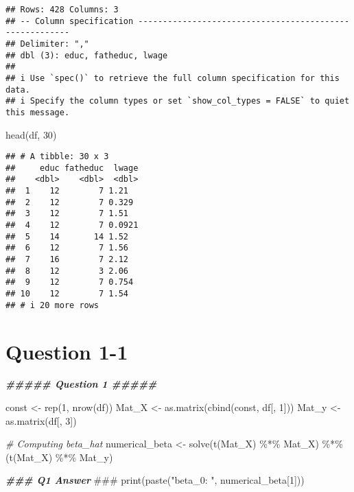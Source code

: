 \documentclass[
]{article}
\newenvironment{Shaded}{\begin{snugshade}}{\end{snugshade}}
\newcommand{\AlertTok}[1]{\textcolor[rgb]{0.94,0.16,0.16}{#1}}
\newcommand{\CommentTok}[1]{\textcolor[rgb]{0.56,0.35,0.01}{\textit{#1}}}
\newcommand{\DecValTok}[1]{\textcolor[rgb]{0.00,0.00,0.81}{#1}}
\newcommand{\DocumentationTok}[1]{\textcolor[rgb]{0.56,0.35,0.01}{\textbf{\textit{#1}}}}
\newcommand{\FunctionTok}[1]{\textcolor[rgb]{0.00,0.00,0.00}{#1}}
\newcommand{\NormalTok}[1]{#1}
\newcommand{\OtherTok}[1]{\textcolor[rgb]{0.56,0.35,0.01}{#1}}
\newcommand{\SpecialCharTok}[1]{\textcolor[rgb]{0.00,0.00,0.00}{#1}}
\newcommand{\StringTok}[1]{\textcolor[rgb]{0.31,0.60,0.02}{#1}}
\begin{document}
\begin{verbatim}
## Rows: 428 Columns: 3
## -- Column specification --------------------------------------------------------
## Delimiter: ","
## dbl (3): educ, fatheduc, lwage
## 
## i Use `spec()` to retrieve the full column specification for this data.
## i Specify the column types or set `show_col_types = FALSE` to quiet this message.
\end{verbatim}

\begin{Shaded}
\begin{Highlighting}[]
\FunctionTok{head}\NormalTok{(df, }\DecValTok{30}\NormalTok{)}
\end{Highlighting}
\end{Shaded}

\begin{verbatim}
## # A tibble: 30 x 3
##     educ fatheduc  lwage
##    <dbl>    <dbl>  <dbl>
##  1    12        7 1.21  
##  2    12        7 0.329 
##  3    12        7 1.51  
##  4    12        7 0.0921
##  5    14       14 1.52  
##  6    12        7 1.56  
##  7    16        7 2.12  
##  8    12        3 2.06  
##  9    12        7 0.754 
## 10    12        7 1.54  
## # i 20 more rows
\end{verbatim}

\hypertarget{question-1-1}{%
\section{Question 1-1}\label{question-1-1}}

\begin{Shaded}
\begin{Highlighting}[]
\DocumentationTok{\#\#\#\#\# Question 1 \#\#\#\#\#}

\NormalTok{const }\OtherTok{\textless{}{-}} \FunctionTok{rep}\NormalTok{(}\DecValTok{1}\NormalTok{, }\FunctionTok{nrow}\NormalTok{(df))}
\NormalTok{Mat\_X }\OtherTok{\textless{}{-}} \FunctionTok{as.matrix}\NormalTok{(}\FunctionTok{cbind}\NormalTok{(const, df[, }\DecValTok{1}\NormalTok{]))}
\NormalTok{Mat\_y }\OtherTok{\textless{}{-}} \FunctionTok{as.matrix}\NormalTok{(df[, }\DecValTok{3}\NormalTok{])}

\CommentTok{\# Computing beta\_hat}
\NormalTok{numerical\_beta }\OtherTok{\textless{}{-}} \FunctionTok{solve}\NormalTok{(}\FunctionTok{t}\NormalTok{(Mat\_X) }\SpecialCharTok{\%*\%}\NormalTok{ Mat\_X) }\SpecialCharTok{\%*\%}\NormalTok{ (}\FunctionTok{t}\NormalTok{(Mat\_X) }\SpecialCharTok{\%*\%}\NormalTok{ Mat\_y) }

\DocumentationTok{\#\#\# Q1 Answer }\AlertTok{\#\#\#}
\FunctionTok{print}\NormalTok{(}\FunctionTok{paste}\NormalTok{(}\StringTok{"beta\_0: "}\NormalTok{, numerical\_beta[}\DecValTok{1}\NormalTok{]))}
\end{Highlighting}
\end{Shaded}
\end{document}
